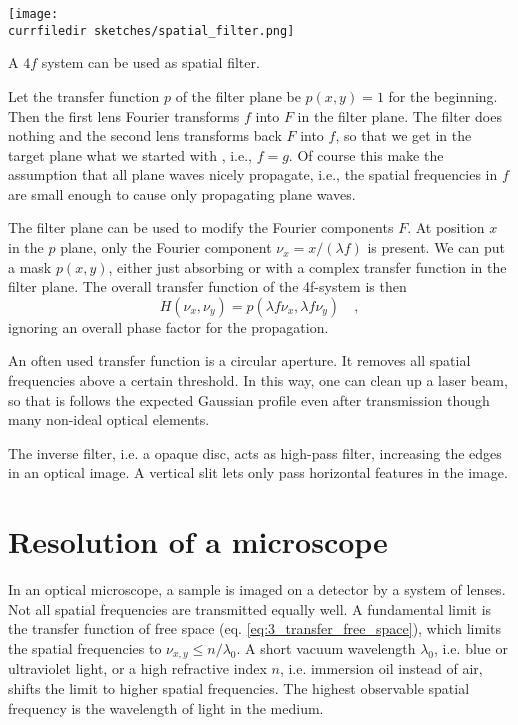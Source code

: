 \begin{marginfigure}
    \texttt{[image: \\currfiledir sketches/spatial\_filter.png]}
    \caption{A $4f$ system can be used as spatial filter.}
\end{marginfigure}

Let the transfer function $p$ of the filter plane be $p(x,y)=1$ for the beginning. Then the first lens Fourier transforms $f$ into $F$ in the filter plane. The filter does nothing and the second lens transforms back $F$ into $f$, so that we get in the target plane what we started with , i.e., $f=g$. Of course this make the assumption that all plane waves nicely propagate, i.e., the spatial frequencies in $f$ are small enough to cause only propagating plane waves.

The filter plane can be used to modify the Fourier components $F$. At position $x$ in the $p$ plane, only the Fourier component $\nu_x = x / (\lambda f)$ is present. We can put a mask $p(x,y)$, either just absorbing or with a complex transfer function in the filter plane. The overall transfer function of the 4f-system is then
\begin{equation}
    H(\nu_x, \nu_y) = p (\lambda f \nu_x, \lambda f \nu_y) \quad , 
\end{equation}
ignoring an overall phase factor for the propagation. 

An often used transfer function is a circular aperture. It removes all spatial frequencies above a certain threshold. In this way, one can clean up a laser beam, so that is follows the expected Gaussian profile even after transmission though many non-ideal optical elements.

The inverse filter, i.e. a opaque disc, acts as high-pass filter, increasing the edges in an optical image. A vertical slit lets only pass horizontal features in the image.



\section{Resolution of a microscope}

In an optical microscope, a sample is imaged on a detector by a system of lenses. Not all spatial frequencies are transmitted equally well. A fundamental limit is the transfer function of free space (eq. \ref{eq:3_transfer_free_space}), which limits the spatial frequencies to $\nu_{x,y} \le n / \lambda_0$. A short vacuum wavelength $\lambda_0$, i.e. blue or ultraviolet light, or a high refractive index $n$, i.e. immersion oil instead of air, shifts the limit to higher spatial frequencies. The highest observable spatial frequency is the wavelength of light in the medium.

